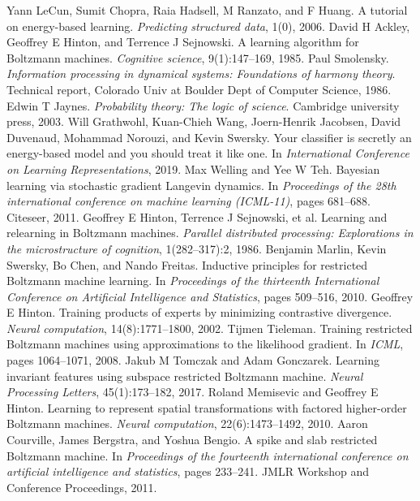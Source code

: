 \begin{chapterreferences}
 Yann LeCun, Sumit Chopra, Raia Hadsell, M Ranzato, and F Huang. A tutorial on energy-based learning. \emph{Predicting structured data}, 1(0), 2006.
 David H Ackley, Geoffrey E Hinton, and Terrence J Sejnowski. A learning algorithm for Boltzmann machines. \emph{Cognitive science}, 9(1):147–169, 1985.
 Paul Smolensky. \emph{Information processing in dynamical systems: Foundations of harmony theory}. Technical report, Colorado Univ at Boulder Dept of Computer Science, 1986.
 Edwin T Jaynes. \emph{Probability theory: The logic of science}. Cambridge university press, 2003.
 Will Grathwohl, Kuan-Chieh Wang, Joern-Henrik Jacobsen, David Duvenaud, Mohammad Norouzi, and Kevin Swersky. Your classifier is secretly an energy-based model and you should treat it like one. In \emph{International Conference on Learning Representations}, 2019.
 Max Welling and Yee W Teh. Bayesian learning via stochastic gradient Langevin dynamics. In \emph{Proceedings of the 28th international conference on machine learning (ICML-11)}, pages 681–688. Citeseer, 2011.
 Geoffrey E Hinton, Terrence J Sejnowski, et al. Learning and relearning in Boltzmann machines. \emph{Parallel distributed processing: Explorations in the microstructure of cognition}, 1(282–317):2, 1986.
 Benjamin Marlin, Kevin Swersky, Bo Chen, and Nando Freitas. Inductive principles for restricted Boltzmann machine learning. In \emph{Proceedings of the thirteenth International Conference on Artificial Intelligence and Statistics}, pages 509–516, 2010.
 Geoffrey E Hinton. Training products of experts by minimizing contrastive divergence. \emph{Neural computation}, 14(8):1771–1800, 2002.
 Tijmen Tieleman. Training restricted Boltzmann machines using approximations to the likelihood gradient. In \emph{ICML}, pages 1064–1071, 2008.
 Jakub M Tomczak and Adam Gonczarek. Learning invariant features using subspace restricted Boltzmann machine. \emph{Neural Processing Letters}, 45(1):173–182, 2017.
 Roland Memisevic and Geoffrey E Hinton. Learning to represent spatial transformations with factored higher-order Boltzmann machines. \emph{Neural computation}, 22(6):1473–1492, 2010.
 Aaron Courville, James Bergstra, and Yoshua Bengio. A spike and slab restricted Boltzmann machine. In \emph{Proceedings of the fourteenth international conference on artificial intelligence and statistics}, pages 233–241. JMLR Workshop and Conference Proceedings, 2011.

\end{chapterreferences}
